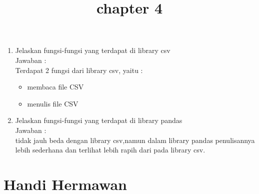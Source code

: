 \begin{enumerate}
\item Jelaskan  fungsi-fungsi yang terdapat di library csv\\
Jawaban :\\
Terdapat 2 fungsi dari library csv, yaitu :

\begin{itemize}
\item membaca file CSV
\end{itemize}

\begin{itemize}
\item menulis file CSV
\end{itemize}


\item Jelaskan  fungsi-fungsi yang terdapat di library pandas\\
Jawaban :\\
 tidak jauh beda dengan library csv,namun dalam library pandas penulisannya lebih sederhana dan terlihat lebih rapih dari pada library csv.

\end{enumerate}


\title{chapter 4}
\section{Handi Hermawan}
